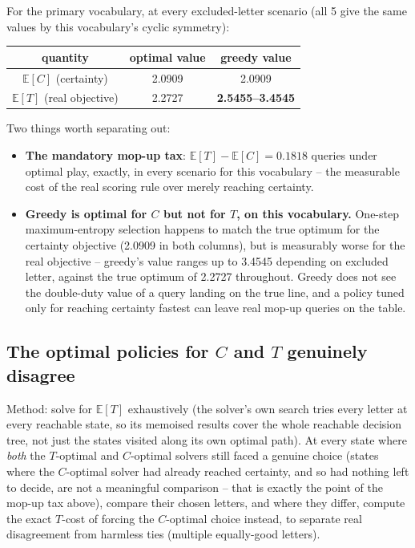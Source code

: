 \documentclass[11pt]{article}
\begin{document}
For the primary vocabulary, at every excluded-letter scenario (all 5 give
the same values by this vocabulary's cyclic symmetry):

\begin{center}
\begin{tabular}{ccc}
\toprule
quantity & optimal value & greedy value \\
\midrule
$\mathbb{E}[C]$ (certainty) & 2.0909 & 2.0909 \\
$\mathbb{E}[T]$ (real objective) & 2.2727 & \textbf{2.5455--3.4545} \\
\bottomrule
\end{tabular}
\end{center}

Two things worth separating out:
\begin{itemize}
  \item \textbf{The mandatory mop-up tax}: $\mathbb{E}[T] - \mathbb{E}[C]
  = 0.1818$ queries under optimal play, exactly, in every scenario for
  this vocabulary -- the measurable cost of the real scoring rule over
  merely reaching certainty.
  \item \textbf{Greedy is optimal for $C$ but not for $T$, on this
  vocabulary.} One-step maximum-entropy selection happens to match the
  true optimum for the certainty objective (2.0909 in both columns), but
  is measurably worse for the real objective -- greedy's value ranges up
  to 3.4545 depending on excluded letter, against the true optimum of
  2.2727 throughout. Greedy does not see the double-duty value of a query
  landing on the true line, and a policy tuned only for reaching
  certainty fastest can leave real mop-up queries on the table.
\end{itemize}

\subsection{The optimal policies for $C$ and $T$ genuinely disagree}

Method: solve for $\mathbb{E}[T]$ exhaustively (the solver's own search
tries every letter at every reachable state, so its memoised results
cover the whole reachable decision tree, not just the states visited
along its own optimal path). At every state where \emph{both} the
$T$-optimal and $C$-optimal solvers still faced a genuine choice (states
where the $C$-optimal solver had already reached certainty, and so had
nothing left to decide, are not a meaningful comparison -- that is
exactly the point of the mop-up tax above), compare their chosen letters,
and where they differ, compute the exact $T$-cost of forcing the
$C$-optimal choice instead, to separate real disagreement from harmless
ties (multiple equally-good letters).
\end{document}
